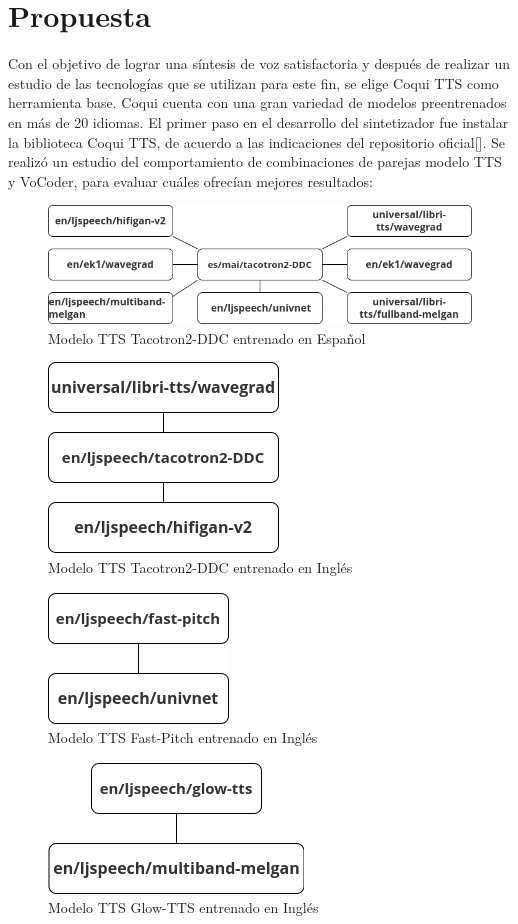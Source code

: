 \chapter{Propuesta}\label{chapter:proposal}

Con el objetivo de lograr una síntesis de voz satisfactoria y después de realizar un estudio de las tecnologías que se utilizan para este fin, se elige Coqui TTS como herramienta base. Coqui cuenta con una gran variedad de modelos preentrenados en más de 20 idiomas.  
El primer paso en el desarrollo del sintetizador fue instalar la biblioteca Coqui TTS, de acuerdo a las indicaciones del repositorio oficial[\cite{coqui-doc}]. Se realizó un estudio del comportamiento de combinaciones de parejas modelo TTS y VoCoder, para evaluar cuáles ofrecían mejores resultados:

\begin{figure}[H]
	\centering
	\includegraphics[width=0.7\linewidth]{Graphics/es_mai}
	\caption{Modelo TTS Tacotron2-DDC entrenado en Español}
	\label{esmai}
\end{figure}

\begin{figure}[H]
	\centering
	\includegraphics[width=0.3\linewidth]{Graphics/en_ljspeech}
	\caption{Modelo TTS Tacotron2-DDC entrenado en Inglés}
	\label{enljspeech}
\end{figure}

\begin{figure}[H]
	\centering
	\includegraphics[width=0.3\linewidth]{Graphics/fastpitch}
	\caption{Modelo TTS Fast-Pitch entrenado en Inglés}
	\label{fastpitch}
\end{figure}
\begin{figure}[H]
	\centering
	\includegraphics[width=0.4\linewidth]{Graphics/glow_tts}
	\caption{Modelo TTS Glow-TTS entrenado en Inglés}
	\label{glowtts}
\end{figure}



